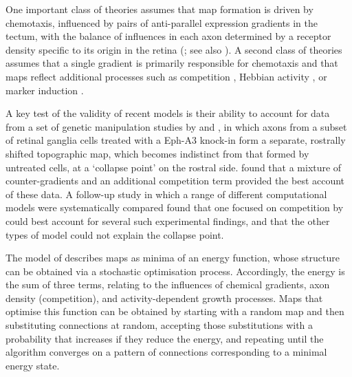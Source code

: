 \documentclass[9pt]{elife} %
\newcommand{\redcmnt}[1]{\textcolor{colcmnt}{#1}}
\begin{document}
One important class of theories assumes that map formation is driven by chemotaxis, influenced by pairs of anti-parallel expression gradients in the tectum, with the balance of influences in each axon determined by a receptor density specific to its origin in the retina (\citealp{Gierer1983,Gierer1987,Simpson2011}; see also \citealp{Karbowski2004,James2020}). A second class of theories assumes that a single gradient is primarily responsible for chemotaxis and that maps reflect additional processes such as competition \citep{Triplett2011}, Hebbian activity \citep{Tsigankov2006,Tsigankov2010}, or marker induction \citep{Prestige1975,Willshaw2006}.

A key test of the validity of recent models is their ability to account for data from a set of genetic manipulation studies by \cite{brown_topographic_2000} and \cite{reber_relative_2004}, in which axons from a subset of retinal ganglia cells treated with a Eph-A3 knock-in form a separate, rostrally shifted topographic map, which becomes indistinct from that formed by untreated cells, at a ‘collapse point’ on the rostral side. \cite{Sterratt2013} found that a mixture of counter-gradients and an additional competition term provided the best account of these data. A follow-up study in which a range of different computational models were systematically compared \citep{hjorth_quantitative_2015} found that \redcmnt{one focused on competition
by \cite{Triplett2011}} could best account for several such experimental findings, and that the other types of model could not explain the collapse point.

\redcmnt{The model of \cite{Triplett2011} describes maps as minima of an energy function}, whose structure can be obtained via a stochastic optimisation process. Accordingly, the energy is the sum of three terms, relating to the influences of chemical gradients, axon density (competition), and activity-dependent growth processes. Maps that optimise this function can be obtained by starting with a random map and then substituting connections at random, accepting those substitutions with a probability that increases if they reduce the energy, and repeating until the algorithm converges on a pattern of connections corresponding to a minimal energy state.
\end{document}
